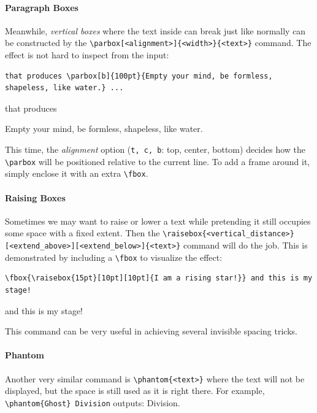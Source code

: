 \paragraph{Paragraph Boxes}
Meanwhile, \textit{vertical boxes} where the text inside can break just like normally can be constructed by the \texttt{\textbackslash parbox[<alignment>]\{<width>\}\allowbreak\{<text>\}} command. The effect is not hard to inspect from the input:
\begin{lstlisting}
that produces \parbox[b]{100pt}{Empty your mind, be formless, shapeless, like water.} ...
\end{lstlisting}
that produces \parbox[b]{100pt}{Empty your mind, be formless, shapeless, like water.} This time, the \textit{alignment} option (\verb|t, c, b|: top, center, bottom) decides how the \texttt{\textbackslash parbox} will be positioned relative to the current line. To add a frame around it, simply enclose it with an extra \texttt{\textbackslash fbox}.

\paragraph{Raising Boxes}
Sometimes we may want to raise or lower a text while pretending it still occupies some space with a fixed extent. Then the \texttt{\textbackslash raisebox\{<vertical\allowbreak\_distance>\}[<extend\_above>][<extend\_below>]\{<text>\}} command will do the job. This is demonstrated by including a \texttt{\textbackslash fbox} to visualize the effect:
\begin{lstlisting}
\fbox{\raisebox{15pt}[10pt][10pt]{I am a rising star!}} and this is my stage!
\end{lstlisting}
 and this is my stage!\par
This command can be very useful in achieving several invisible spacing tricks.

\paragraph{Phantom}
Another very similar command is \texttt{\textbackslash phantom\{<text>\}} where the text will not be displayed, but the space is still used as it is right there. For example, \texttt{\textbackslash phantom\{Ghost\} Division} outputs: \phantom{Ghost} Division.

